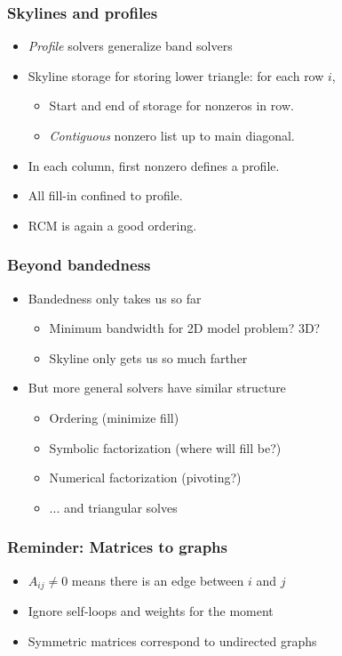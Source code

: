 \documentclass{beamer}
\begin{document}
\begin{frame}
  \frametitle{Skylines and profiles}

  \begin{itemize}
  \item {\em Profile} solvers generalize band solvers
  \item Skyline storage for storing lower triangle: for each row $i$,
    \begin{itemize}
    \item Start and end of storage for nonzeros in row.
    \item {\em Contiguous} nonzero list up to main diagonal.
    \end{itemize}
  \item In each column, first nonzero defines a profile.
  \item All fill-in confined to profile.
  \item RCM is again a good ordering.
  \end{itemize}
\end{frame}


\begin{frame}
  \frametitle{Beyond bandedness}

  \begin{itemize}
  \item Bandedness only takes us so far
    \begin{itemize}
    \item Minimum bandwidth for 2D model problem?  3D?
    \item Skyline only gets us so much farther
    \end{itemize}
  \item But more general solvers have similar structure
    \begin{itemize}
    \item Ordering (minimize fill)
    \item Symbolic factorization (where will fill be?)
    \item Numerical factorization (pivoting?)
    \item ... and triangular solves
    \end{itemize}
  \end{itemize}
\end{frame}


\begin{frame}
  \frametitle{Reminder: Matrices to graphs}

  \begin{itemize}
  \item $A_{ij} \neq 0$ means there is an edge between $i$ and $j$
  \item Ignore self-loops and weights for the moment
  \item Symmetric matrices correspond to undirected graphs
  \end{itemize}
\end{frame}
\end{document}
